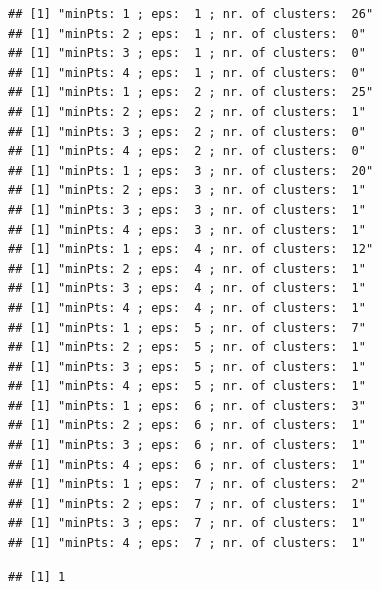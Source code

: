 \documentclass[
]{article}
\newenvironment{Shaded}{\begin{snugshade}}{\end{snugshade}}
\newcommand{\AttributeTok}[1]{\textcolor[rgb]{0.77,0.63,0.00}{#1}}
\newcommand{\CommentTok}[1]{\textcolor[rgb]{0.56,0.35,0.01}{\textit{#1}}}
\newcommand{\DecValTok}[1]{\textcolor[rgb]{0.00,0.00,0.81}{#1}}
\newcommand{\FunctionTok}[1]{\textcolor[rgb]{0.00,0.00,0.00}{#1}}
\newcommand{\NormalTok}[1]{#1}
\newcommand{\OtherTok}[1]{\textcolor[rgb]{0.56,0.35,0.01}{#1}}
\newcommand{\SpecialCharTok}[1]{\textcolor[rgb]{0.00,0.00,0.00}{#1}}
\begin{document}
\begin{verbatim}
## [1] "minPts: 1 ; eps:  1 ; nr. of clusters:  26"
## [1] "minPts: 2 ; eps:  1 ; nr. of clusters:  0"
## [1] "minPts: 3 ; eps:  1 ; nr. of clusters:  0"
## [1] "minPts: 4 ; eps:  1 ; nr. of clusters:  0"
## [1] "minPts: 1 ; eps:  2 ; nr. of clusters:  25"
## [1] "minPts: 2 ; eps:  2 ; nr. of clusters:  1"
## [1] "minPts: 3 ; eps:  2 ; nr. of clusters:  0"
## [1] "minPts: 4 ; eps:  2 ; nr. of clusters:  0"
## [1] "minPts: 1 ; eps:  3 ; nr. of clusters:  20"
## [1] "minPts: 2 ; eps:  3 ; nr. of clusters:  1"
## [1] "minPts: 3 ; eps:  3 ; nr. of clusters:  1"
## [1] "minPts: 4 ; eps:  3 ; nr. of clusters:  1"
## [1] "minPts: 1 ; eps:  4 ; nr. of clusters:  12"
## [1] "minPts: 2 ; eps:  4 ; nr. of clusters:  1"
## [1] "minPts: 3 ; eps:  4 ; nr. of clusters:  1"
## [1] "minPts: 4 ; eps:  4 ; nr. of clusters:  1"
## [1] "minPts: 1 ; eps:  5 ; nr. of clusters:  7"
## [1] "minPts: 2 ; eps:  5 ; nr. of clusters:  1"
## [1] "minPts: 3 ; eps:  5 ; nr. of clusters:  1"
## [1] "minPts: 4 ; eps:  5 ; nr. of clusters:  1"
## [1] "minPts: 1 ; eps:  6 ; nr. of clusters:  3"
## [1] "minPts: 2 ; eps:  6 ; nr. of clusters:  1"
## [1] "minPts: 3 ; eps:  6 ; nr. of clusters:  1"
## [1] "minPts: 4 ; eps:  6 ; nr. of clusters:  1"
## [1] "minPts: 1 ; eps:  7 ; nr. of clusters:  2"
## [1] "minPts: 2 ; eps:  7 ; nr. of clusters:  1"
## [1] "minPts: 3 ; eps:  7 ; nr. of clusters:  1"
## [1] "minPts: 4 ; eps:  7 ; nr. of clusters:  1"
\end{verbatim}

\begin{Shaded}
\end{Shaded}

\begin{verbatim}
## [1] 1
\end{verbatim}
\end{document}
